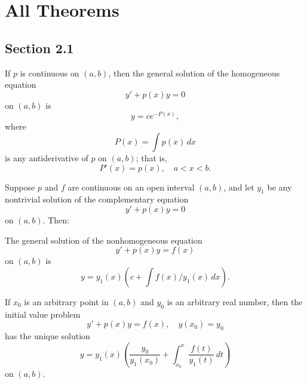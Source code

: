 
\hypersetup{allcolors=black}


\chapter*{All Theorems}
\makeatletter
{}
\makeatother

\section*{Section 2.1}
{}
\setcounter{chapter}{2}
\setcounter{section}{1}

\setcounter{theorem}{0}
\setcounter{equation}{11}
\begin{theorem}
  \label{thmtype:2.1.1} If $p$ is continuous on $(a,b)$, then the general solution of the
  homogeneous equation
  \begin{equation}
    \label{eq:2.1.12}y'+p(x)y=0
  \end{equation}
  on $(a,b)$ is
  \[
    y=ce^{-P(x)},
  \]
  where
  \begin{equation}
    \label{eq:2.1.13}P(x)=\int p(x)\,dx
  \end{equation}
  is any antiderivative of $p$ on $(a,b)$; that is,
  \begin{equation}
    \label{eq:2.1.14}P'(x)=p(x),\quad a<x<b.
  \end{equation}
\end{theorem}

\setcounter{theorem}{1}
\setcounter{equation}{30}
\begin{theorem}
  \label{thmtype:2.1.2} Suppose $p$ and $f$ are continuous on an open interval $(a,b)$, and let
  $y_{1}$ be any nontrivial solution of the complementary equation
  \[
    y'+p(x)y=0
  \]
  on $(a,b)$. Then:
  \begin{alist}
    \item %
    The general solution of the nonhomogeneous equation
    \begin{equation}
      \label{eq:2.1.31}y'+p(x)y=f(x)
    \end{equation}
    on $(a,b)$ is
    \begin{equation}
      \label{eq:2.1.32}y=y_{1}(x)\left(c+\int f(x)/y_{1}(x)\,dx\right).
    \end{equation}

    \item %
    If $x_{0}$ is an arbitrary point in $(a,b)$ and $y_{0}$ is an arbitrary real number, then the
    initial value problem
    \[
      y'+p(x)y=f(x),\quad y(x_{0})=y_{0}
    \]
    has the unique solution
    \[
      y=y_{1}(x)\left(\frac{y_{0}}{y_{1}(x_{0})}+\int^{x}_{x_{0}}\frac{f(t)}{y_{1}(t)}\,dt\right)
    \]
    on $(a,b)$.
  \end{alist}
\end{theorem}

